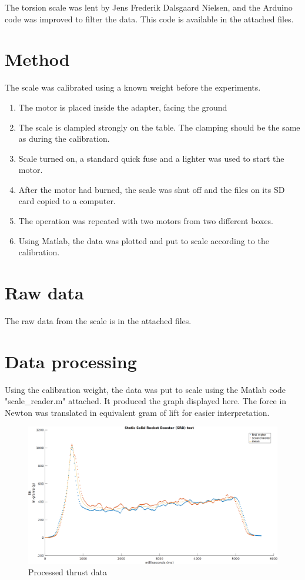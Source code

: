 The torsion scale was lent by Jens Frederik Dalsgaard Nielsen, and the Arduino code was improved to filter the data. This code is available in the attached files.

\section*{Method}
The scale was calibrated using a known weight before the experiments.

\begin{enumerate}
\item The motor is placed inside the adapter, facing the ground
\item The scale is clampled strongly on the table. The clamping should be the same as during the calibration.
\item Scale turned on, a standard quick fuse and a lighter was used to start the motor.
\item After the motor had burned, the scale was shut off and the files on its SD card copied to a computer.
\item The operation was repeated with two motors from two different boxes.
\item Using Matlab, the data was plotted and put to scale according to the calibration.
\end{enumerate}
\section*{Raw data}
The raw data from the scale is in the attached files.
\section*{Data processing}
Using the calibration weight, the data was put to scale using the Matlab code "scale_reader.m" attached. It produced the graph displayed here. The force in Newton was translated in equivalent gram of lift for easier interpretation.

\begin{figure} [h]
	\centering
	\includegraphics[width=\linewidth]{figures/appendix/srb_test}
	\caption{Processed thrust data}
	\label{fig:thrust_graph}
\end{figure}

